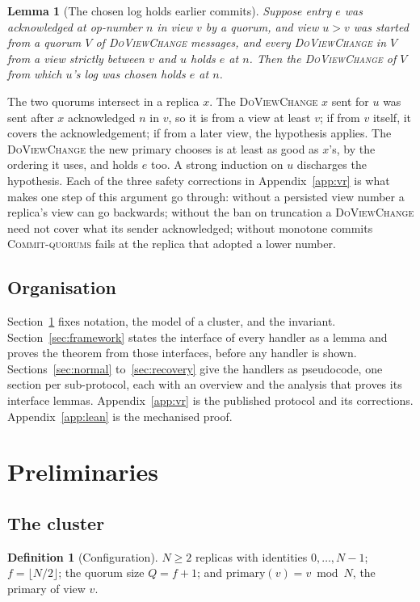 \documentclass[11pt,a4paper]{article}
\theoremstyle{plain}
\newtheorem{lemma}[theorem]{Lemma}
\theoremstyle{definition}
\newtheorem{definition}[theorem]{Definition}
\theoremstyle{remark}
\newcommand{\msg}[1]{\textsc{#1}}
\newcommand{\dvc}{\msg{DoViewChange}}
\newcommand{\primary}{\mathrm{primary}}
\newcommand{\CommitsBacked}{\textsc{Commit-quorums}}
\begin{document}
\begin{lemma}[The chosen log holds earlier commits]
\label{lem:chosen-intro}
Suppose entry $e$ was acknowledged at op-number $n$ in view $v$ by a
quorum, and view $u > v$ was started from a quorum $V$ of \dvc{}
messages, and every \dvc{} in $V$ from a view strictly between $v$ and
$u$ holds $e$ at $n$. Then the \dvc{} of $V$ from which $u$'s log was
chosen holds $e$ at $n$.
\end{lemma}

The two quorums intersect in a replica $x$. The \dvc{} $x$ sent for
$u$ was sent after $x$ acknowledged $n$ in $v$, so it is from a view at
least $v$; if from $v$ itself, it covers the acknowledgement; if from a
later view, the hypothesis applies. The \dvc{} the new primary chooses
is at least as good as $x$'s, by the ordering it uses, and holds $e$
too. A strong
induction on $u$ discharges the hypothesis. Each of the three safety
corrections in Appendix~\ref{app:vr} is what makes one step of this
argument go through: without a persisted view number a replica's view
can go backwards; without the ban on truncation a \dvc{} need not
cover what its sender acknowledged; without monotone commits \CommitsBacked{}
fails at the replica that adopted a lower number.

\subsection{Organisation}

Section~\ref{sec:prelim} fixes notation, the model of a cluster, and the
invariant. Section~\ref{sec:framework} states the interface of every
handler as a lemma and proves the theorem from those interfaces, before
any handler is shown. Sections~\ref{sec:normal} to~\ref{sec:recovery}
give the handlers as pseudocode, one section per sub-protocol, each with
an overview and the analysis that proves its interface lemmas.
Appendix~\ref{app:vr} is the published protocol and its corrections.
Appendix~\ref{app:lean} is the mechanised proof.

\section{Preliminaries}
\label{sec:prelim}

\subsection{The cluster}

\begin{definition}[Configuration]
\label{def:config}
$N \ge 2$ replicas with identities $0, \dots, N-1$; $f = \lfloor N/2
\rfloor$; the quorum size $Q = f + 1$; and $\primary(v) = v \bmod N$, the
primary of view $v$.
\end{definition}
\end{document}
